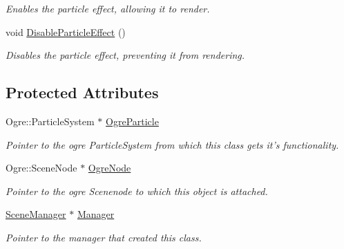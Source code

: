 \begin{DoxyCompactItemize}
\begin{DoxyCompactList}\small\item\em Enables the particle effect, allowing it to render. \item\end{DoxyCompactList}\item 
\hypertarget{classphys_1_1ParticleEffect_abd9f2339d22582055fe4ae45f986ff8c}{
void \hyperlink{classphys_1_1ParticleEffect_abd9f2339d22582055fe4ae45f986ff8c}{DisableParticleEffect} ()}
\label{d2/d69/classphys_1_1ParticleEffect_abd9f2339d22582055fe4ae45f986ff8c}

\begin{DoxyCompactList}\small\item\em Disables the particle effect, preventing it from rendering. \item\end{DoxyCompactList}\end{DoxyCompactItemize}
\subsection*{Protected Attributes}
\begin{DoxyCompactItemize}
\item 
\hypertarget{classphys_1_1ParticleEffect_a187582776f54626a02638263ccae85d4}{
Ogre::ParticleSystem $\ast$ \hyperlink{classphys_1_1ParticleEffect_a187582776f54626a02638263ccae85d4}{OgreParticle}}
\label{d2/d69/classphys_1_1ParticleEffect_a187582776f54626a02638263ccae85d4}

\begin{DoxyCompactList}\small\item\em Pointer to the ogre ParticleSystem from which this class gets it's functionality. \item\end{DoxyCompactList}\item 
\hypertarget{classphys_1_1ParticleEffect_acd59a6f4ca0ae96802f5a26d0b8ed5a6}{
Ogre::SceneNode $\ast$ \hyperlink{classphys_1_1ParticleEffect_acd59a6f4ca0ae96802f5a26d0b8ed5a6}{OgreNode}}
\label{d2/d69/classphys_1_1ParticleEffect_acd59a6f4ca0ae96802f5a26d0b8ed5a6}

\begin{DoxyCompactList}\small\item\em Pointer to the ogre Scenenode to which this object is attached. \item\end{DoxyCompactList}\item 
\hypertarget{classphys_1_1ParticleEffect_a3bd2292e7835d7816b3e74d6926acfa2}{
\hyperlink{classphys_1_1SceneManager}{SceneManager} $\ast$ \hyperlink{classphys_1_1ParticleEffect_a3bd2292e7835d7816b3e74d6926acfa2}{Manager}}
\label{d2/d69/classphys_1_1ParticleEffect_a3bd2292e7835d7816b3e74d6926acfa2}

\begin{DoxyCompactList}\small\item\em Pointer to the manager that created this class. \item\end{DoxyCompactList}\end{DoxyCompactItemize}
